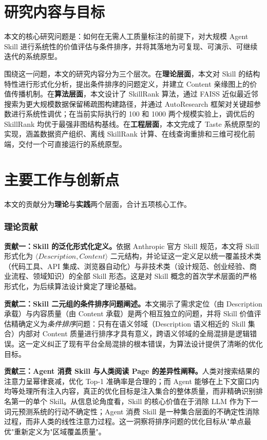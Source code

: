 \section{研究内容与目标}
\label{sec:research_content}

本文的核心研究问题是：如何在无需人工质量标注的前提下，对大规模 Agent Skill 进行系统性的价值评估与条件排序，并将其落地为可复现、可演示、可继续迭代的系统原型。

围绕这一问题，本文的研究内容分为三个层次。在\textbf{理论层面}，本文对 Skill 的结构特性进行形式化分析，提出条件排序的问题定义，并建立 Content 亲缘图上的价值传播机制。在\textbf{算法层面}，本文设计了 SkillRank 算法，通过 FAISS 近似最近邻搜索为更大规模数据保留稀疏图构建路径，并通过 AutoResearch 框架对关键超参数进行系统性调优；在当前实际执行的 100 和 1000 两个规模实验上，调优后的 SkillRank 均优于最强非图结构基线。在\textbf{工程层面}，本文完成了 Taste 系统原型的实现，涵盖数据资产组织、离线 SkillRank 计算、在线查询重排和三维可视化前端，交付一个可直接运行的系统原型。

\section{主要工作与创新点}
\label{sec:contributions}

本文的贡献分为\textbf{理论}与\textbf{实践}两个层面，合计五项核心工作。

\subsubsection*{理论贡献}

\textbf{贡献一：Skill 的泛化形式化定义。}依据 Anthropic 官方 Skill 规范\cite{anthropic2025skills}，本文将 Skill 形式化为 $\langle Description, Content \rangle$ 二元结构，并论证这一定义足以统一覆盖技术类（代码工具、API 集成、浏览器自动化）与非技术类（设计规范、创业经验、商业流程、领域知识）的全部 Skill 形态。这是对 Skill 概念的首次学术层面的严格形式化，为后续算法设计奠定了理论基础。

\textbf{贡献二：Skill 二元组的条件排序问题阐述。}本文揭示了需求定位（由 Description 承载）与内容质量（由 Content 承载）是两个相互独立的问题，并将 Skill 价值评估精确定义为\textit{条件排序}问题：只有在语义邻域（Description 语义相近的 Skill 集合）内部对 Content 质量进行排序才具有意义，跨语义邻域的全局混排是逻辑错误。这一定义纠正了现有平台全局混排的根本错误，为算法设计提供了清晰的优化目标。

\textbf{贡献三：Agent 消费 Skill 与人类阅读 Page 的差异性阐释。}人类对搜索结果的注意力呈幂律衰减，优化 Top-1 准确率是合理的；而 Agent 能够在上下文窗口内均等处理所有注入内容\cite{liu2024lostinthemiddle}，真正的优化目标是注入集合的整体质量，而非精确识别排名第一的单个 Skill。从信息论角度看\cite{shannon1948communication}，Skill 的核心价值在于消除 LLM 作为下一词元预测系统\cite{brown2020gpt3}的行动不确定性；Agent 消费 Skill 是一种集合层面的不确定性消除过程，而非人类的线性注意力过程。这一洞察将排序问题的优化目标从"单点最优"重新定义为"区域覆盖质量"。

